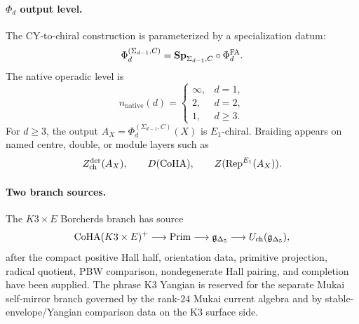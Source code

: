 \paragraph{\texorpdfstring{$\Phi_d$}{Phi-d} output level.}
The CY-to-chiral construction is parameterized by a specialization datum:
\[
 \Phi_d^{(\Sigma_{d-1},C)}
 =
 \mathbf{Sp}_{\Sigma_{d-1},C}\circ\Phi_d^{\mathrm{FA}}.
\]
The native operadic level is
\[
 n_{\mathrm{native}}(d)=
 \begin{cases}
 \infty,& d=1,\\
 2,& d=2,\\
 1,& d\geq3.
 \end{cases}
\]
For \(d\geq3\), the output \(A_X=\Phi_d^{(\Sigma_{d-1},C)}(X)\) is
\(E_1\)-chiral.  Braiding appears on named centre, double, or module
layers such as
\[
 Z^{\mathrm{der}}_{\mathrm{ch}}(A_X),\qquad
 D(\mathrm{CoHA}),\qquad
 Z(\mathrm{Rep}^{E_1}(A_X)).
\]

\paragraph{Two branch sources.}
The \(K3\times E\) Borcherds branch has source
\[
 \mathrm{CoHA}(K3\times E)^+
 \longrightarrow
 \mathrm{Prim}
 \longrightarrow
 \mathfrak{g}_{\Delta_5}
 \longrightarrow
 U_{\mathrm{ch}}(\mathfrak{g}_{\Delta_5}),
\]
after the compact positive Hall half, orientation data, primitive
projection, radical quotient, PBW comparison, nondegenerate Hall pairing,
and completion have been supplied.  The phrase K3 Yangian is reserved for
the separate Mukai self-mirror branch governed by the rank-\(24\) Mukai
current algebra and by stable-envelope/Yangian comparison data on the K3
surface side.

